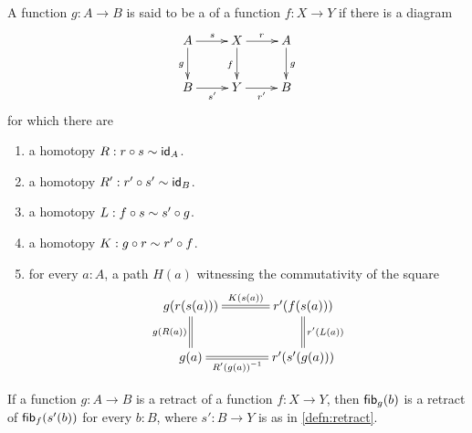 \documentclass[hott-all.tex]{subfiles}
\begin{document}
\begin{defn}\label{defn:retract}
A function $g:A\to B$ is said to be a 
of a function $f:X\to Y$ if there is a diagram
\begin{equation*}
  \xymatrix{
    {A} \ar[r]^{s} \ar[d]_{g}
    &
    {X} \ar[r]^{r} \ar[d]_{f}
    &
    {A} \ar[d]^{g}
    \\
    {B} \ar[r]_{s'}
    &
    {Y} \ar[r]_{r'}
    &
    {B}
  }
\end{equation*}
for which there are
\begin{enumerate}
\item a homotopy $R:r\circ s \htpy \idfunc[A]$.
\item a homotopy $R':r'\circ s' \htpy\idfunc[B]$.
\item a homotopy $L:f\circ s\htpy s'\circ g$.
\item a homotopy $K:g\circ r\htpy r'\circ f$.
\item for every $a:A$, a path $H(a)$ witnessing the commutativity of the square
\begin{equation*}
  \xymatrix@C=3pc{
    {g(r(s(a)))} \ar@{=}[r]^-{K(s(a))} \ar@{=}[d]_{\ap g{R(a)}}
    &
    {r'(f(s(a)))} \ar@{=}[d]^{\ap{r'}{L(a)}}
    \\
    {g(a)} \ar@{=}[r]_-{\opp{R'(g(a))}}
    &
    {r'(s'(g(a)))}
  }
\end{equation*}
\end{enumerate}
\end{defn}


\begin{lem}\label{lem:func_retract_to_fiber_retract}
If a function $g:A\to B$ is a retract of a function $f:X\to Y$, then $\hfib{g}b$ is a retract of $\hfib{f}{s'(b)}$
for every $b:B$, where $s':B\to Y$ is as in \cref{defn:retract}.
\end{lem}
\end{document}
